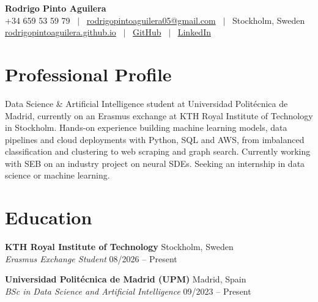\documentclass[10pt,a4paper]{article}
\begin{document}
\begin{center}
    {\Huge \textbf{Rodrigo Pinto Aguilera}} \\ \vspace{5pt}
    \small +34 659 53 59 79 \ $\vert$ \
    \href{mailto:rodrigopintoaguilera05@gmail.com}{rodrigopintoaguilera05@gmail.com} \ $\vert$ \
    Stockholm, Sweden \\ \vspace{2pt}
    \href{https://rodrigopintoaguilera.github.io}{rodrigopintoaguilera.github.io} \ $\vert$ \
    \href{https://github.com/RodrigoPintoAguilera}{GitHub} \ $\vert$ \
    \href{https://www.linkedin.com/in/rodrigo-pinto-aguilera-432141397/}{LinkedIn}
\end{center}

\vspace{2pt}

\section{Professional Profile}

\noindent
\small{Data Science \& Artificial Intelligence student at Universidad Politécnica de Madrid, currently on an Erasmus exchange at KTH Royal Institute of Technology in Stockholm. Hands-on experience building machine learning models, data pipelines and cloud deployments with Python, SQL and AWS, from imbalanced classification and clustering to web scraping and graph search. Currently working with SEB on an industry project on neural SDEs. Seeking an internship in data science or machine learning.}
\vspace{5pt}

\section{Education}

\noindent
\textbf{KTH Royal Institute of Technology} \hfill Stockholm, Sweden \\
\textit{Erasmus Exchange Student} \hfill 08/2026 -- Present

\vspace{5pt}

\noindent
\textbf{Universidad Politécnica de Madrid (UPM)} \hfill Madrid, Spain \\
\textit{BSc in Data Science and Artificial Intelligence} \hfill 09/2023 -- Present
\end{document}

